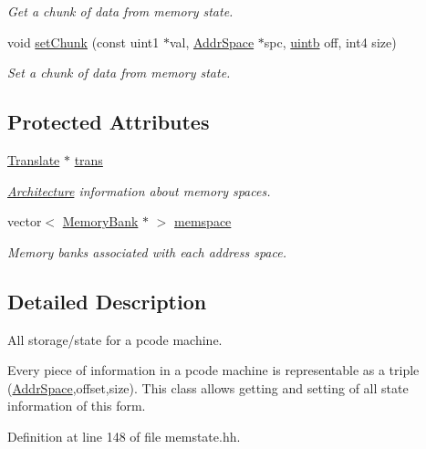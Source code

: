 \begin{DoxyCompactItemize}
\begin{DoxyCompactList}\small\item\em Get a chunk of data from memory state. \end{DoxyCompactList}\item 
void \mbox{\hyperlink{class_memory_state_aa8d03c2a848a00090098b75f1fe877e1}{set\+Chunk}} (const uint1 $\ast$val, \mbox{\hyperlink{class_addr_space}{Addr\+Space}} $\ast$spc, \mbox{\hyperlink{types_8h_a2db313c5d32a12b01d26ac9b3bca178f}{uintb}} off, int4 size)
\begin{DoxyCompactList}\small\item\em Set a chunk of data from memory state. \end{DoxyCompactList}\end{DoxyCompactItemize}
\subsection*{Protected Attributes}
\begin{DoxyCompactItemize}
\item 
\mbox{\hyperlink{class_translate}{Translate}} $\ast$ \mbox{\hyperlink{class_memory_state_a5ca981e0a6790657297a29da282c343b}{trans}}
\begin{DoxyCompactList}\small\item\em \mbox{\hyperlink{class_architecture}{Architecture}} information about memory spaces. \end{DoxyCompactList}\item 
vector$<$ \mbox{\hyperlink{class_memory_bank}{Memory\+Bank}} $\ast$ $>$ \mbox{\hyperlink{class_memory_state_a2731beff27c773def592922b2f71d76d}{memspace}}
\begin{DoxyCompactList}\small\item\em Memory banks associated with each address space. \end{DoxyCompactList}\end{DoxyCompactItemize}


\subsection{Detailed Description}
All storage/state for a pcode machine. 

Every piece of information in a pcode machine is representable as a triple (\mbox{\hyperlink{class_addr_space}{Addr\+Space}},offset,size). This class allows getting and setting of all state information of this form. 

Definition at line 148 of file memstate.\+hh.



